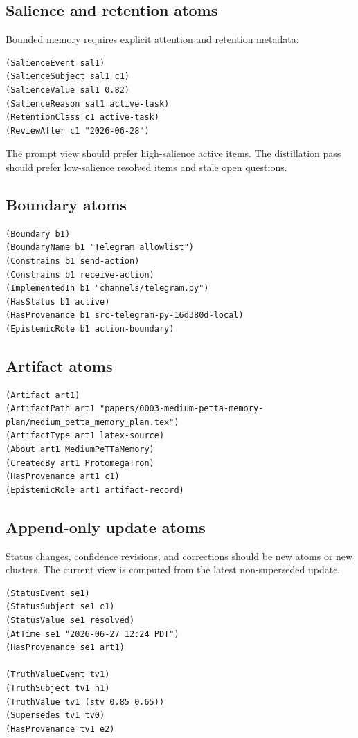 \documentclass[11pt]{article}
\begin{document}
\subsection{Salience and retention atoms}

Bounded memory requires explicit attention and retention metadata:

\begin{verbatim}
(SalienceEvent sal1)
(SalienceSubject sal1 c1)
(SalienceValue sal1 0.82)
(SalienceReason sal1 active-task)
(RetentionClass c1 active-task)
(ReviewAfter c1 "2026-06-28")
\end{verbatim}

The prompt view should prefer high-salience active items.  The distillation pass
should prefer low-salience resolved items and stale open questions.

\subsection{Boundary atoms}

\begin{verbatim}
(Boundary b1)
(BoundaryName b1 "Telegram allowlist")
(Constrains b1 send-action)
(Constrains b1 receive-action)
(ImplementedIn b1 "channels/telegram.py")
(HasStatus b1 active)
(HasProvenance b1 src-telegram-py-16d380d-local)
(EpistemicRole b1 action-boundary)
\end{verbatim}

\subsection{Artifact atoms}

\begin{verbatim}
(Artifact art1)
(ArtifactPath art1 "papers/0003-medium-petta-memory-plan/medium_petta_memory_plan.tex")
(ArtifactType art1 latex-source)
(About art1 MediumPeTTaMemory)
(CreatedBy art1 ProtomegaTron)
(HasProvenance art1 c1)
(EpistemicRole art1 artifact-record)
\end{verbatim}

\subsection{Append-only update atoms}

Status changes, confidence revisions, and corrections should be new atoms or new
clusters.  The current view is computed from the latest non-superseded update.

\begin{verbatim}
(StatusEvent se1)
(StatusSubject se1 c1)
(StatusValue se1 resolved)
(AtTime se1 "2026-06-27 12:24 PDT")
(HasProvenance se1 art1)

(TruthValueEvent tv1)
(TruthSubject tv1 h1)
(TruthValue tv1 (stv 0.85 0.65))
(Supersedes tv1 tv0)
(HasProvenance tv1 e2)
\end{verbatim}
\end{document}

